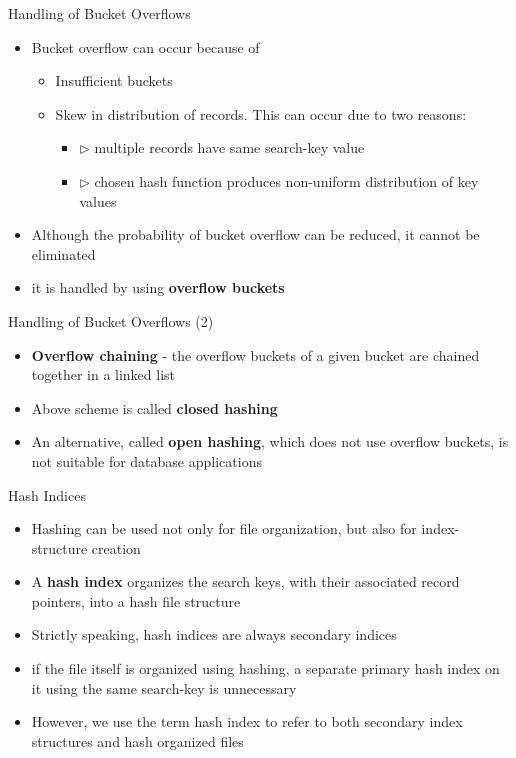 \documentclass[aspectratio=169, xcolor=dvipsnames]{beamer}
\begin{document}
\begin{frame}{Handling of Bucket Overflows}
    \begin{itemize}[<+->]
        \item Bucket overflow can occur because of
        \begin{itemize}[<+->]
            \item Insufficient buckets
            \item Skew in distribution of records. This can occur due to two reasons:
            \begin{itemize}[<+->]
                \item $\triangleright$ multiple records have same search-key value
                \item $\triangleright$ chosen hash function produces non-uniform distribution of key values
            \end{itemize}
        \end{itemize}
        \item Although the probability of bucket overflow can be reduced, it cannot be eliminated
        \item it is handled by using \textbf{overflow buckets}
    \end{itemize}
\end{frame}

\begin{frame}{Handling of Bucket Overflows (2)}
    \begin{itemize}[<+->]
        \item \textbf{Overflow chaining} - the overflow buckets of a given bucket are chained together in a linked list
        \item Above scheme is called \textbf{closed hashing}
        \item An alternative, called \textbf{open hashing}, which does not use overflow buckets, is not suitable for database applications
    \end{itemize}
\end{frame}

\begin{frame}{Hash Indices}
    \begin{itemize}[<+->]
        \item Hashing can be used not only for file organization, but also for index-structure creation
        \item A \textbf{hash index} organizes the search keys, with their associated record pointers, into a hash file structure
        \item Strictly speaking, hash indices are always secondary indices
        \item if the file itself is organized using hashing, a separate primary hash index on it using the same search-key is unnecessary
        \item However, we use the term hash index to refer to both secondary index structures and hash organized files
    \end{itemize}
\end{frame}
\end{document}
